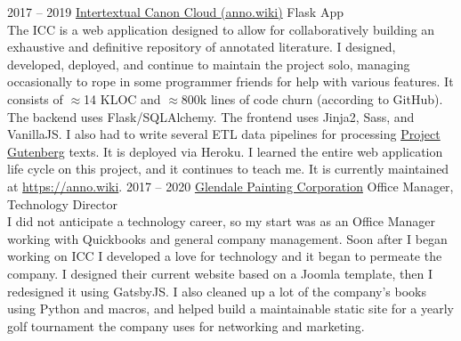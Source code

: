\documentclass[9pt]{developercv} %
\begin{document}
\begin{entrylist}
{        }
    \entry
        {2017 -- 2019}
        {{\href{https://github.com/Anno-Wiki/icc}{Intertextual Canon Cloud (anno.wiki)}}}
        {Flask App}
        {
            \slashsep
            \slashsep
            \slashsep
            \slashsep
            \slashsep
            \slashsep
            \\
            The ICC is a web application designed to allow for collaboratively
            building an exhaustive and definitive repository of annotated
            literature. I designed, developed, deployed, and continue to
            maintain the project solo, managing occasionally to rope in some
            programmer friends for help with various features. It consists of
            $\approx$14 KLOC and $\approx$800k lines of code churn (according
            to GitHub). The backend uses Flask/SQLAlchemy. The frontend uses
            Jinja2, Sass, and VanillaJS. I also had to write several ETL data
            pipelines for processing {\href{https://gutenberg.org}{Project
            Gutenberg}} texts.  It is deployed via Heroku. I learned the entire
            web application life cycle on this project, and it continues to
            teach me. It is currently maintained at
            {\href{https://anno.wiki}{https://anno.wiki}}.
        }
    \entry
        {2017 -- 2020}
        {{\href{https://glendalepainting.com/}{Glendale Painting Corporation}}}
        {Office Manager, Technology Director}
        {
            \slashsep
            \slashsep
            \slashsep
            \slashsep
            \slashsep
            \slashsep
            \\
            I did not anticipate a technology career, so my start was as an
            Office Manager working with Quickbooks and general company
            management. Soon after I began working on ICC I developed a love for
            technology and it began to permeate the company. I designed their
            current website based on a Joomla template, then I redesigned it
            using GatsbyJS. I also cleaned up a lot of the company's books using
            Python and macros, and helped build a maintainable static site
            for a yearly golf tournament the company uses for networking and
            marketing.
        }
\end{entrylist}
\end{document}
